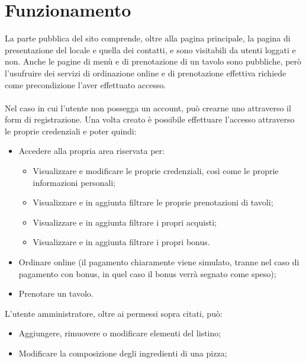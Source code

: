 \section{Funzionamento}

La parte pubblica del sito comprende, oltre alla pagina principale, la pagina di presentazione del locale
e quella dei contatti, e sono visitabili da utenti loggati e non. Anche le pagine di menù e di prenotazione
di un tavolo sono pubbliche, però l'usufruire dei servizi di ordinazione online e di
prenotazione effettiva richiede come precondizione l'aver effettuato accesso.\\
\\
Nel caso in cui l'utente non possegga un account, può crearne uno attraverso il form di registrazione.
Una volta creato è possibile effettuare l'accesso attraverso le proprie credenziali e poter quindi:
\begin{itemize}
	\item Accedere alla propria area riservata per:
	\begin{itemize}
		\item Visualizzare e modificare le proprie credenziali, così come le proprie informazioni
		personali;
		\item Visualizzare e in aggiunta filtrare le proprie prenotazioni di tavoli;
		\item Visualizzare e in aggiunta filtrare i propri acquisti;
		\item Visualizzare e in aggiunta filtrare i propri bonus.
	\end{itemize}
	\item Ordinare online (il pagamento chiaramente viene simulato, tranne nel caso di pagamento con
	bonus, in quel caso il bonus verrà segnato come speso);
	\item Prenotare un tavolo.
\end{itemize}
L'utente amministratore, oltre ai permessi sopra citati, può:
\begin{itemize}
	\item Aggiungere, rimuovere o modificare elementi del listino;
	\item Modificare la composizione degli ingredienti di una pizza;
\end{itemize}
